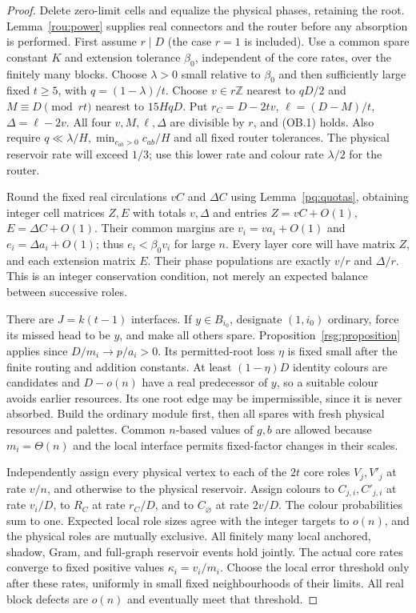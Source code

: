 \begin{proof}
Delete zero-limit cells and equalize the physical phases, retaining
the root. Lemma~\ref{rou:power} supplies real connectors and the
router before any absorption is performed. First assume $r\mid{}D$
(the case $r=1$ is included). Use a common spare constant $K$ and extension tolerance $\beta_0$, independent of the core rates, over the finitely many blocks. Choose $\lambda>0$ small relative to $\beta_0$ and then sufficiently large fixed $t\ge5$, with $q=(1-\lambda)/t$. Choose $v\in{}r\mathbb{Z}$ nearest to $qD/2$ and $M\equiv{}D\pmod{rt}$ nearest to $15HqD$. Put $r_C=D-2tv$, $\ell=(D-M)/t$, $\Delta=\ell-2v$. All four $v,M,\ell,\Delta$ are divisible by $r$, and (OB.1) holds. Also require $q\ll\lambda/H,\min_{c_{ab}>0}c_{ab}/H$ and all fixed router tolerances. The physical reservoir rate will exceed $1/3$; use this lower rate and colour rate $\lambda/2$ for the router.

Round the fixed real circulations $vC$ and $\Delta{}C$ using Lemma~\ref{pq:quotas}, obtaining integer cell matrices $Z,E$ with totals $v,\Delta$ and entries $Z=vC+O(1)$, $E=\Delta{}C+O(1)$. Their common margins are $v_i=va_i+O(1)$ and $e_i=\Delta{}a_i+O(1)$; thus $e_i<\beta_0v_i$ for large $n$. Every layer core will have matrix $Z$, and each extension matrix $E$. Their phase populations are exactly $v/r$ and $\Delta/r$. This is an integer conservation condition, not merely an expected
balance between successive roles.

There are $J=k(t-1)$ interfaces. If $y\in{}B_{i_0}$, designate $(1,i_0)$ ordinary, force its missed head to be $y$, and make all others spare. Proposition~\ref{rsg:proposition} applies since $D/m_i\to{}p/a_i>0$. Its permitted-root loss $\eta$ is fixed small after the finite routing and addition constants. At least $(1-\eta)D$ identity colours are candidates and $D-o(n)$ have a real predecessor of $y$, so a suitable colour avoids earlier resources. Its one root edge may be impermissible, since it is
never absorbed. Build the ordinary module first, then all spares
with fresh physical resources and palettes. Common $n$-based values of $g,b$ are allowed because $m_i=\Theta(n)$ and the local interface permits fixed-factor changes in their scales.

Independently assign every physical vertex to each of the $2t$ core roles $V_j,V'_j$ at rate $v/n$, and otherwise to the physical reservoir. Assign colours to $C_{j,i},C'_{j,i}$ at rate $v_i/D$, to $R_C$ at rate $r_C/D$, and to $C_\varnothing$ at rate $2v/D$. The colour probabilities sum to one. Expected local role sizes
agree with the integer targets to $o(n)$, and the physical roles are mutually exclusive. All finitely many local anchored, shadow,
Gram, and full-graph reservoir events hold jointly. The actual
core rates converge to fixed positive values $\kappa_i=v_i/m_i$. Choose the local error threshold only after these rates, uniformly in small fixed neighbourhoods of their limits.
All real block defects are $o(n)$ and eventually meet that threshold.


\end{proof}
